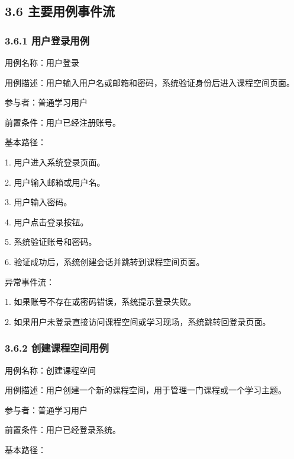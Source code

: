 \documentclass[10pt,a4paper,fontset=none]{ctexart}
\begin{document}
\subsection*{3.6 主要用例事件流}

\subsubsection*{3.6.1 用户登录用例}

用例名称：用户登录\par

用例描述：用户输入用户名或邮箱和密码，系统验证身份后进入课程空间页面。\par

参与者：普通学习用户\par

前置条件：用户已经注册账号。\par

基本路径：\par

1. 用户进入系统登录页面。\par
2. 用户输入邮箱或用户名。\par
3. 用户输入密码。\par
4. 用户点击登录按钮。\par
5. 系统验证账号和密码。\par
6. 验证成功后，系统创建会话并跳转到课程空间页面。\par

异常事件流：\par

1. 如果账号不存在或密码错误，系统提示登录失败。\par
2. 如果用户未登录直接访问课程空间或学习现场，系统跳转回登录页面。\par

\subsubsection*{3.6.2 创建课程空间用例}

用例名称：创建课程空间\par

用例描述：用户创建一个新的课程空间，用于管理一门课程或一个学习主题。\par

参与者：普通学习用户\par

前置条件：用户已经登录系统。\par

基本路径：\par
\end{document}
